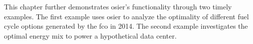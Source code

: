 This chapter further demonstrates \ac{osier}'s functionality through two timely
examples. The first example uses \ac{osier} to analyze the optimality of
different fuel cycle options generated by the \ac{fco} in 2014. The second example
investigates the optimal energy mix to power a hypothetical data center.



